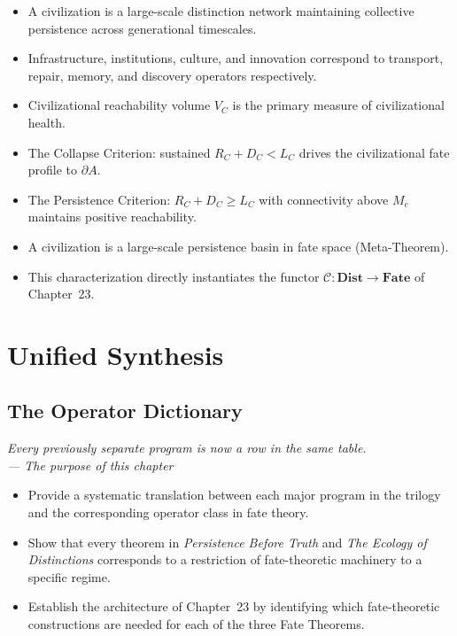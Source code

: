 \documentclass[12pt,twoside,openright]{book}
\newcommand{\admRegion}{A}
\newcommand{\catDist}{\mathbf{Dist}}
\newcommand{\catFate}{\mathbf{Fate}}
\newcommand{\civFunc}{\mathcal{C}}
\newenvironment{epigraph}[2]{%
  \vspace{1em}\begin{flushright}
  \begin{minipage}{0.72\textwidth}
  \itshape\small #1\\[0.4em]
  \upshape\footnotesize\sffamily\color{DistGray}--- #2
  \end{minipage}\end{flushright}\vspace{1.5em}}{}
\newenvironment{objectives}{%
  \begin{tcolorbox}[colback=DistBlue!5,colframe=DistBlue,
    title={\faCheckCircle\enspace Chapter Objectives},
    fonttitle=\sffamily\bfseries\color{white},
    attach boxed title to top left={yshift=-2mm,xshift=4mm},
    boxed title style={colback=DistBlue},breakable]
  \begin{itemize}[leftmargin=*,nosep]}{%
  \end{itemize}\end{tcolorbox}\vspace{1em}}
\newenvironment{chapsummary}{%
  \begin{tcolorbox}[colback=DistBlue!5,colframe=DistBlue,
    title={\faBookOpen\enspace Summary},
    fonttitle=\sffamily\bfseries\color{white},
    attach boxed title to top left={yshift=-2mm,xshift=4mm},
    boxed title style={colback=DistBlue,rounded corners}]
  \begin{itemize}[nosep,leftmargin=*]}{%
  \end{itemize}\end{tcolorbox}}
\providecommand{\admRegion}{A}
\providecommand{\discRate}{D_{C}}
\providecommand{\lossRate}{L_{C}}
\providecommand{\repairRate}{R_{C}}
\providecommand{\civReach}{V_{C}}
\providecommand{\critThresh}{M_{c}}
\providecommand{\catDist}{\mathbf{Dist}}
\providecommand{\catFate}{\mathbf{Fate}}
\providecommand{\civFunc}{\mathcal{C}}
\begin{document}
\begin{chapsummary}
\item A civilization is a large-scale distinction network
  maintaining collective persistence across generational
  timescales.
\item Infrastructure, institutions, culture, and innovation
  correspond to transport, repair, memory, and discovery
  operators respectively.
\item Civilizational reachability volume $\civReach$ is the
  primary measure of civilizational health.
\item The Collapse Criterion: sustained
  $\repairRate+\discRate<\lossRate$ drives the civilizational
  fate profile to $\partial\admRegion$.
\item The Persistence Criterion: $\repairRate+\discRate\ge
  \lossRate$ with connectivity above $\critThresh$ maintains
  positive reachability.
\item A civilization is a large-scale persistence basin in fate
  space (Meta-Theorem).
\item This characterization directly instantiates the functor
  $\civFunc:\catDist\to\catFate$ of Chapter~23.
\end{chapsummary}

\part{Unified Synthesis}



\chapter{The Operator Dictionary}
\label{ch:op-dict}

\begin{epigraph}{Every previously separate program is now a row
  in the same table.}{The purpose of this chapter}
\end{epigraph}

\begin{objectives}
\item Provide a systematic translation between each major
  program in the trilogy and the corresponding operator class
  in fate theory.
\item Show that every theorem in \textit{Persistence Before
  Truth} and \textit{The Ecology of Distinctions} corresponds
  to a restriction of fate-theoretic machinery to a specific
  regime.
\item Establish the architecture of Chapter~23 by identifying
  which fate-theoretic constructions are needed for each of the
  three Fate Theorems.
\end{objectives}
\end{document}
